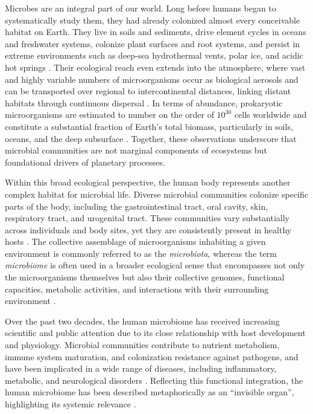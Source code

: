 Microbes are an integral part of our world. Long before humans began to systematically study them, they had already colonized almost every conceivable habitat on Earth. They live in soils and sediments, drive element cycles in oceans and freshwater systems, colonize plant surfaces and root systems, and persist in extreme environments such as deep-sea hydrothermal vents, polar ice, and acidic hot springs \citep{whitman1998prokaryotes, bar-on2018biomass, thompson2017communal,
fierer2017embracing, %
sunagawa2015structure, %
trivedi2020plant, %
anesio2017microbiome}. %
Their ecological reach even extends into the atmosphere, where vast and highly variable numbers of microorganisms occur as biological aerosols and can be transported over regional to intercontinental distances, linking distant habitats through continuous dispersal \citep{santl-temkiv2022microbial}.
In terms of abundance, prokaryotic microorganisms are estimated to number on the order of $10^{30}$ cells worldwide and constitute a substantial fraction of Earth’s total biomass, particularly in soils, oceans, and the deep subsurface \citep{whitman1998prokaryotes,bar-on2018biomass}. Together, these observations underscore that microbial communities are not marginal components of ecosystems but foundational drivers of planetary processes.

Within this broad ecological perspective, the human body represents another complex habitat for microbial life. Diverse microbial communities colonize specific parts of the body, including the gastrointestinal tract, oral cavity, skin, respiratory tract, and urogenital tract. These communities vary substantially across individuals and body sites, yet they are consistently present in healthy hosts \citep{turnbaugh2007human,hmp2009nihHMP}. The collective assemblage of microorganisms inhabiting a given environment is commonly referred to as the \emph{microbiota}, whereas the term \emph{microbiome} is often used in a broader ecological sense that encompasses not only the microorganisms themselves but also their collective genomes, functional capacities, metabolic activities, and interactions with their surrounding environment \citep{berg2020microbiome,xia2024applied}. 

Over the past two decades, the human microbiome has received increasing scientific and public attention due to its close relationship with host development and physiology. Microbial communities contribute to nutrient metabolism, immune system maturation, and colonization resistance against pathogens, and have been implicated in a wide range of diseases, including inflammatory, metabolic, and neurological disorders \citep{hooper2012interactions,gevers2014treatmentnaive,aggarwal2023microbiome,turnbaugh2006obesity}. Reflecting this functional integration, the human microbiome has been described metaphorically as an ``invisible organ'', highlighting its systemic relevance \citep{baquero2012microbiome,xia2024applied}.

